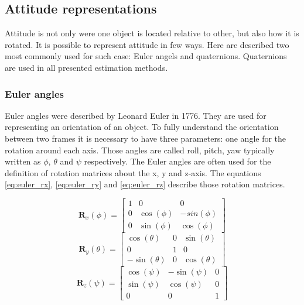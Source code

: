 \documentclass[12pt,a4paper,twoside]{article}
\begin{document}
\subsection{Attitude representations}
Attitude is not only were one object is located relative to other, but also how it is rotated. It is possible to represent attitude in few ways. Here are described two most commonly used for such case: Euler angels and quaternions. Quaternions are used in all presented estimation methods.

\subsubsection{Euler angles}

Euler angles were described by Leonard Euler in 1776\cite{euler1775formulae}. They are used for representing an orientation of an object.
To fully understand the orientation between two frames it is necessary to have three parameters: one angle for the rotation around each axis. Those angles are called roll, pitch, yaw typically written as $\phi$, $\theta$ and $\psi$ respectively. The Euler angles are often used for the definition of rotation matrices about the x, y and z-axis. The equations \ref{eq:euler_rx}, \ref{eq:euler_ry} and \ref{eq:euler_rz} describe those rotation matrices.

\begin{equation} \label{eq:euler_rx}
\bm{R}_x(\phi) = \begin{bmatrix}
1 & 0 & 0 \\
0 & \cos(\phi) & -sin(\phi) \\
0 & \sin(\phi) & \cos(\phi)
\end{bmatrix}
\end{equation}
\begin{equation} \label{eq:euler_ry}
\bm{R}_y(\theta) = \begin{bmatrix}
\cos(\theta) & 0 & \sin(\theta) \\
0 & 1 & 0 \\
-\sin(\theta) & 0 & \cos(\theta)
\end{bmatrix}
\end{equation}
\begin{equation} \label{eq:euler_rz}
\bm{R}_z(\psi) = \begin{bmatrix}
\cos(\psi) & -\sin(\psi) & 0 \\
\sin(\psi) & \cos(\psi) & 0 \\
0 & 0 & 1
\end{bmatrix}
\end{equation}
\end{document}
